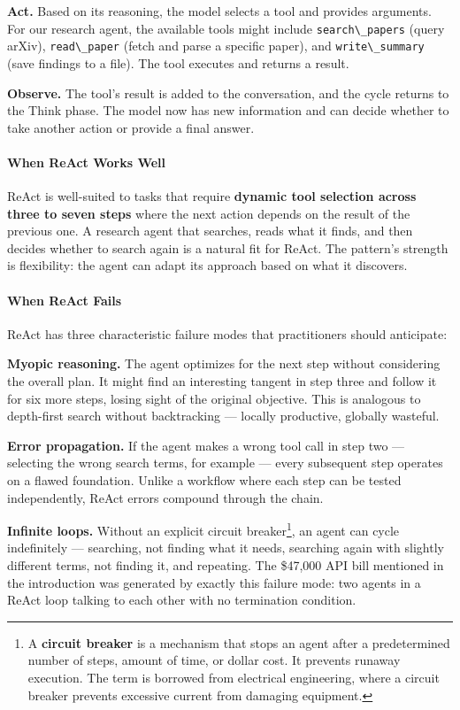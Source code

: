 \documentclass[11pt, a4paper]{article}
\newcommand{\passthrough}[1]{#1}
\begin{document}
\textbf{Act.} Based on its reasoning, the model selects a tool and
provides arguments. For our research agent, the available tools might
include \passthrough{\lstinline!search\_papers!} (query arXiv),
\passthrough{\lstinline!read\_paper!} (fetch and parse a specific
paper), and \passthrough{\lstinline!write\_summary!} (save findings to a
file). The tool executes and returns a result.

\textbf{Observe.} The tool's result is added to the conversation, and
the cycle returns to the Think phase. The model now has new information
and can decide whether to take another action or provide a final answer.

\hypertarget{when-react-works-well}{%
\paragraph{When ReAct Works Well}\label{when-react-works-well}}

ReAct is well-suited to tasks that require \textbf{dynamic tool
selection across three to seven steps} where the next action depends on
the result of the previous one. A research agent that searches, reads
what it finds, and then decides whether to search again is a natural fit
for ReAct. The pattern's strength is flexibility: the agent can adapt
its approach based on what it discovers.

\hypertarget{when-react-fails}{%
\paragraph{When ReAct Fails}\label{when-react-fails}}

ReAct has three characteristic failure modes that practitioners should
anticipate:

\textbf{Myopic reasoning.} The agent optimizes for the next step without
considering the overall plan. It might find an interesting tangent in
step three and follow it for six more steps, losing sight of the
original objective. This is analogous to depth-first search without
backtracking --- locally productive, globally wasteful.

\textbf{Error propagation.} If the agent makes a wrong tool call in step
two --- selecting the wrong search terms, for example --- every
subsequent step operates on a flawed foundation. Unlike a workflow where
each step can be tested independently, ReAct errors compound through the
chain.

\textbf{Infinite loops.} Without an explicit circuit breaker\footnote{A
  \textbf{circuit breaker} is a mechanism that stops an agent after a
  predetermined number of steps, amount of time, or dollar cost. It
  prevents runaway execution. The term is borrowed from electrical
  engineering, where a circuit breaker prevents excessive current from
  damaging equipment.}, an agent can cycle indefinitely --- searching,
not finding what it needs, searching again with slightly different
terms, not finding it, and repeating. The \$47,000 API bill mentioned in
the introduction was generated by exactly this failure mode: two agents
in a ReAct loop talking to each other with no termination condition.
\end{document}
